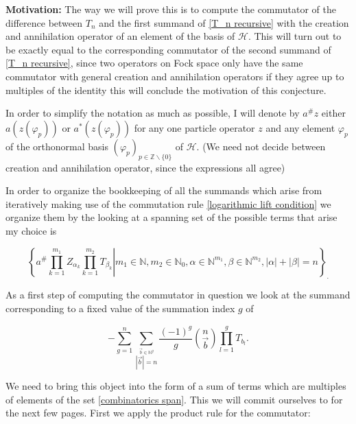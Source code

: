 \documentclass[b5paper,draft,openbib,12pt]{memoir}
\begin{document}
\textbf{Motivation:} The way we will prove this is to compute the commutator of the difference between \(T_n\) and
the first summand of \eqref{T_n recursive} with the creation and annihilation operator of an element of the
basis of \(\mathcal{H}\). This will turn out to be exactly equal
to the corresponding commutator
of the second summand of \eqref{T_n recursive}, since two operators on Fock space only
have the same commutator with general creation and annihilation operators if they
agree up to multiples of the identity this will conclude the motivation of this conjecture. 

 In order to simplify the notation as much as possible, 
I will denote by \(a^\# z\) either \(a(z(\varphi_p))\) or
 \(a^*(z(\varphi_p))\) for any one particle operator \(z\) and any element
 \(\varphi_p\) of the orthonormal basis \((\varphi_p)_{p\in\mathbb{Z}\backslash\{0\}}\) of
 \(\mathcal{H}\). (We need not decide between creation and annihilation 
 operator, since the expressions all agree)
 
In order to organize the bookkeeping of all the summands which arise from iteratively
making use of the commutation rule \eqref{logarithmic lift condition} we organize them 
by the looking at a spanning set of the possible terms that arise my choice is

\begin{equation}\label{combinatorics span}
\left\{ \left. a^\# \prod_{k=1}^{m_1} Z_{\alpha_k} \prod_{k=1}^{m_2}T_{\beta_k} \right|
m_1\in\mathbb{N},m_2\in\mathbb{N}_0, \alpha\in \mathbb{N}^{m_1}, 
\beta \in \mathbb{N}^{m_2}, |\alpha|+|\beta|=n\right\}_.
\end{equation}

As a first step of computing the commutator in question we look at the summand
corresponding to a fixed value of the summation index \(g\) of 

\begin{equation}\label{combinatorics total sum of T}
-\sum_{g=1}^n \sum_{\stackrel{\vec{b}\in\mathbb{N}^g}{|\vec{b}|=n}}\frac{(-1)^g}{g} 
\binom{n}{\vec{b}} \prod_{l=1}^g T_{b_l}.
\end{equation}

 We need to bring this object into the form of a sum
of terms which are multiples of elements of the set \eqref{combinatorics span}.
This we will commit ourselves to for the next few pages. First we apply
the product rule for the commutator:
\end{document}

